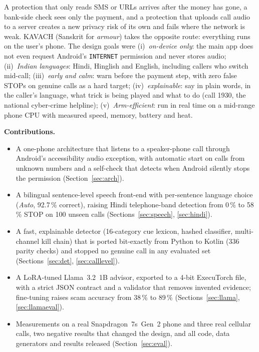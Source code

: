 \documentclass[conference]{IEEEtran}
\begin{document}
A protection that only reads SMS or URLs arrives after the money has gone, a bank-side check sees only the payment, and a protection that uploads call audio to a server creates a new privacy risk of its own and fails where the network is weak. KAVACH (Sanskrit for \emph{armour}) takes the opposite route: everything runs on the user's phone. The design goals were
(i)~\emph{on-device only}: the main app does not even request Android's \texttt{INTERNET} permission and never stores audio;
(ii)~\emph{Indian languages}: Hindi, Hinglish and English, including callers who switch mid-call;
(iii)~\emph{early and calm}: warn before the payment step, with zero false STOPs on genuine calls as a hard target;
(iv)~\emph{explainable}: say in plain words, in the caller's language, what trick is being played and what to do (call 1930, the national cyber-crime helpline);
(v)~\emph{Arm-efficient}: run in real time on a mid-range phone CPU with measured speed, memory, battery and heat.

\textbf{Contributions.}
\begin{itemize}
\item A one-phone architecture that listens to a speaker-phone call through Android's accessibility audio exception, with automatic start on calls from unknown numbers and a self-check that detects when Android silently stops the permission (Section~\ref{sec:arch}).
\item A bilingual sentence-level speech front-end with per-sentence language choice (\emph{Auto}, 92.7\,\% correct), raising Hindi telephone-band detection from 0\,\% to 58\,\% STOP on 100 unseen calls (Sections~\ref{sec:speech}, \ref{sec:hindi}).
\item A fast, explainable detector (16-category cue lexicon, hashed classifier, multi-channel kill chain) that is ported bit-exactly from Python to Kotlin (336 parity checks) and stopped no genuine call in any evaluated set (Sections~\ref{sec:det}, \ref{sec:calllevel}).
\item A LoRA-tuned Llama~3.2~1B advisor, exported to a 4-bit ExecuTorch file, with a strict JSON contract and a validator that removes invented evidence; fine-tuning raises scam accuracy from 38\,\% to 89\,\% (Sections~\ref{sec:llama}, \ref{sec:llamaeval}).
\item Measurements on a real Snapdragon~7s~Gen~2 phone and three real cellular calls, two negative results that changed the design, and all code, data generators and results released (Section~\ref{sec:eval}).
\end{itemize}
\end{document}
